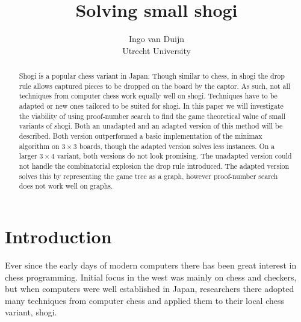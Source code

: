 \documentclass{article}
\title{Solving small shogi}%
\author{Ingo van Duijn \\ Utrecht University}
\begin{document}
\maketitle

\begin{abstract}
Shogi is a popular chess variant in Japan. Though similar to chess, in shogi the drop rule allows captured pieces to be dropped on the board by the captor. As such,
not all techniques from computer chess work equally well on shogi. Techniques have to be adapted or new ones tailored
to be suited for shogi. In this paper we will investigate the viability of using proof-number search to find the game theoretical value of
small variants of shogi. Both an unadapted and an adapted version of this method will be described. Both version outperformed a basic implementation
of the minimax algorithm on $3 \times 3$ boards, though the adapted version solves less instances. On a larger $3 \times 4$ variant, both versions
do not look promising. The unadapted version could not handle the combinatorial explosion the drop rule introduced. The adapted version solves this
by representing the game tree as a graph, however proof-number search does not work well on graphs. 
\end{abstract}

\section{Introduction}
Ever since the early days of modern computers there has been great interest in chess programming. Initial
focus in the west was mainly on chess and checkers, but when computers were well established in Japan, researchers there adopted
many techniques from computer chess and applied them to their local chess variant, shogi.
\end{document}
